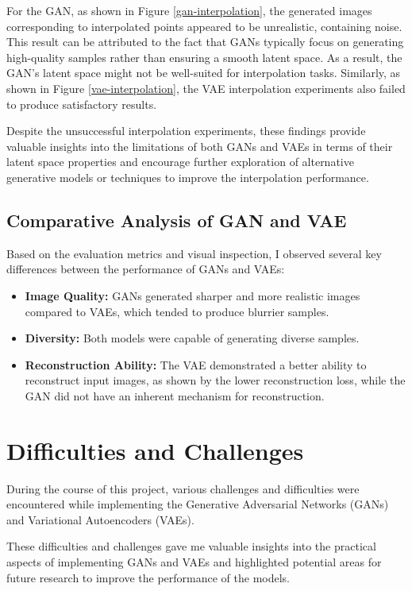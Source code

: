 \documentclass{article}
\begin{document}
For the GAN, as shown in Figure \ref{gan-interpolation}, the generated images corresponding to interpolated points appeared to be unrealistic, containing noise. This result can be attributed to the fact that GANs typically focus on generating high-quality samples rather than ensuring a smooth latent space. As a result, the GAN's latent space might not be well-suited for interpolation tasks. Similarly, as shown in Figure \ref{vae-interpolation}, the VAE interpolation experiments also failed to produce satisfactory results. 

Despite the unsuccessful interpolation experiments, these findings provide valuable insights into the limitations of both GANs and VAEs in terms of their latent space properties and encourage further exploration of alternative generative models or techniques to improve the interpolation performance.

\subsection{Comparative Analysis of GAN and VAE}
Based on the evaluation metrics and visual inspection, I observed several key differences between the performance of GANs and VAEs:
\begin{itemize}
    \item \textbf{Image Quality:} GANs generated sharper and more realistic images compared to VAEs, which tended to produce blurrier samples.
    \item \textbf{Diversity:} Both models were capable of generating diverse samples.
    \item \textbf{Reconstruction Ability:} The VAE demonstrated a better ability to reconstruct input images, as shown by the lower reconstruction loss, while the GAN did not have an inherent mechanism for reconstruction.
\end{itemize}


\section{Difficulties and Challenges}
During the course of this project, various challenges and difficulties were encountered while implementing the Generative Adversarial Networks (GANs) and Variational Autoencoders (VAEs).

These difficulties and challenges gave me valuable insights into the practical aspects of implementing GANs and VAEs and highlighted potential areas for future research to improve the performance of the models.
\end{document}
